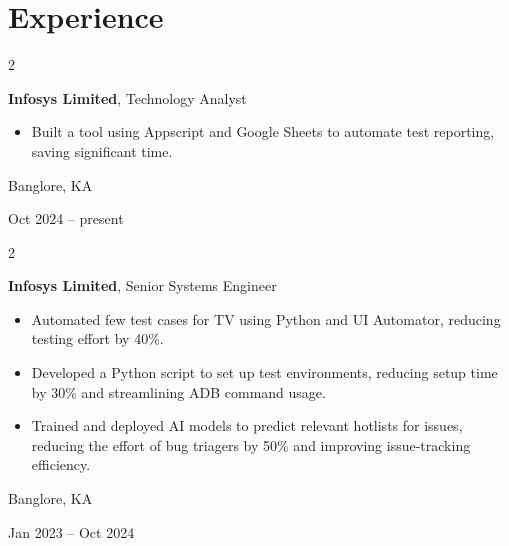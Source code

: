 \documentclass[10pt, letterpaper]{article}
\newenvironment{highlights}{
    \begin{itemize}[
        topsep=0.10 cm,
        parsep=0.10 cm,
        partopsep=0pt,
        itemsep=0pt,
        leftmargin=0.4 cm + 10pt
    ]
}{
    \end{itemize}
} %
\newenvironment{twocolentry}[2][]{
    \onecolentry
    \def\secondColumn{#2}
    \setcolumnwidth{\fill, 4.5 cm}
    \begin{paracol}{2}
}{
    \switchcolumn \raggedleft \secondColumn
    \end{paracol}
    \endonecolentry
} %
\begin{document}
    
    \section{Experience}



        
        \begin{twocolentry}{
            Banglore, KA

        Oct 2024 – present
        }
            \textbf{Infosys Limited}, Technology Analyst
            \begin{highlights}
                \item Built a tool using Appscript and Google Sheets to automate test reporting, saving significant time.
            \end{highlights}
        \end{twocolentry}


        \vspace{0.2 cm}

        \begin{twocolentry}{
            Banglore, KA

        Jan 2023 – Oct 2024
        }
            \textbf{Infosys Limited}, Senior Systems Engineer
            \begin{highlights}
                \item Automated few test cases for TV using Python and UI Automator, reducing testing effort by 40\%.
                \item Developed a Python script to set up test environments, reducing setup time by 30\% and streamlining ADB command usage.
                \item Trained and deployed AI models to predict relevant hotlists for issues, reducing the effort of bug triagers by 50\% and improving issue-tracking efficiency.
            \end{highlights}
        \end{twocolentry}


        \vspace{0.2 cm}
\end{document}
